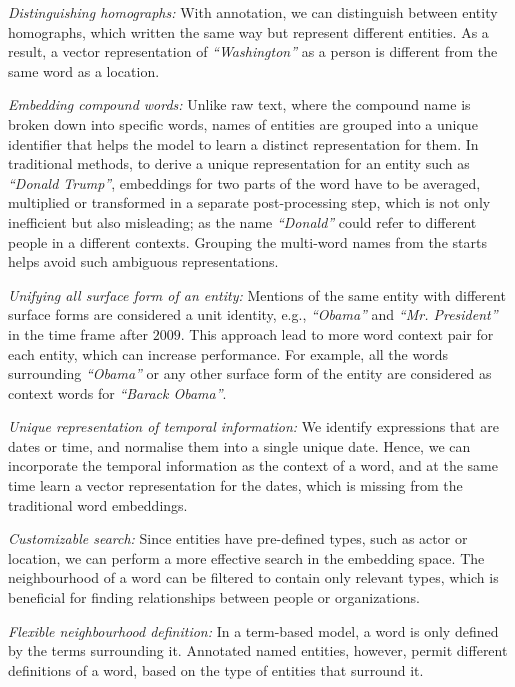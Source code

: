 \begin{compactitem}
\item \emph{Distinguishing homographs:} With annotation, we can distinguish between entity homographs, which written the same way but represent different entities. As a result, a vector representation of \emph{``Washington''} as a person is different from the same word as a location. \\
\item \emph{Embedding compound words:}  Unlike raw text, where the compound name is broken down into specific words, names of entities are grouped into a unique identifier that helps the model to learn a distinct representation for them. In traditional methods, to derive a unique representation for an entity such as \emph{``Donald Trump''}, embeddings for two parts of the word have to be averaged, multiplied or transformed in a separate post-processing step, which is not only inefficient but also misleading; as the name \emph{``Donald''} could refer to different people in a different contexts. Grouping the multi-word names from the starts helps avoid such ambiguous representations.\\ 
\item \emph{Unifying all surface form of an entity:} Mentions of the same entity with different surface forms are considered a unit identity, e.g., \emph{``Obama''} and \emph{``Mr. President''} in the time frame after $2009$. This approach lead to more  word context pair for each entity, which can increase performance. For example, all the words surrounding \emph{``Obama''} or any other surface form of the entity are considered as context words for \emph{``Barack Obama''}. \\
\item \emph{Unique representation of temporal information:} We identify expressions that are dates or time, and normalise them into a single unique date. Hence, we can incorporate the temporal information as the context of a word, and at the same time learn a vector representation for the dates, which is missing from the traditional word embeddings. \\
\item \emph{Customizable search:} Since entities have pre-defined types, such as actor or location, we can perform a more effective search in the embedding space. The neighbourhood of a word can be filtered to contain only relevant types, which is beneficial for finding relationships between people or organizations. \\
\item \emph{Flexible neighbourhood definition:} In a term-based model, a word is only defined by the terms surrounding it.  Annotated named entities, however, permit different definitions of a word, based on the type of entities that surround it.

\end{compactitem}
